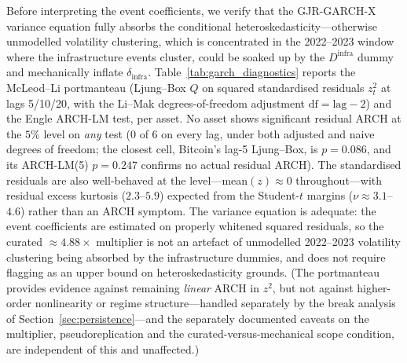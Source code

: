 \documentclass[pdflatex,sn-mathphys-num]{sn-jnl}
\theoremstyle{thmstyleone}
\theoremstyle{thmstyletwo}
\theoremstyle{thmstylethree}
\begin{document}
Before interpreting the event coefficients, we verify that the GJR-GARCH-X variance equation fully absorbs the conditional heteroskedasticity---otherwise unmodelled volatility clustering, which is concentrated in the 2022--2023 window where the infrastructure events cluster, could be soaked up by the $D^{\text{infra}}$ dummy and mechanically inflate $\delta_{\text{infra}}$. Table~\ref{tab:garch_diagnostics} reports the McLeod--Li portmanteau (Ljung--Box $Q$ on squared standardised residuals $z_t^2$ at lags 5/10/20, with the Li--Mak \citep{LiMak1994} degrees-of-freedom adjustment $\text{df}=\text{lag}-2$) and the Engle ARCH-LM test, per asset. No asset shows significant residual ARCH at the $5\%$ level on \emph{any} test (0 of 6 on every lag, under both adjusted and naive degrees of freedom; the closest cell, Bitcoin's lag-5 Ljung--Box, is $p=0.086$, and its ARCH-LM(5) $p=0.247$ confirms no actual residual ARCH). The standardised residuals are also well-behaved at the level---mean$(z)\approx 0$ throughout---with residual excess kurtosis ($2.3$--$5.9$) expected from the Student-$t$ margins ($\nu\approx 3.1$--$4.6$) rather than an ARCH symptom. The variance equation is adequate: the event coefficients are estimated on properly whitened squared residuals, so the curated $\approx 4.88\times$ multiplier is not an artefact of unmodelled 2022--2023 volatility clustering being absorbed by the infrastructure dummies, and does not require flagging as an upper bound on heteroskedasticity grounds. (The portmanteau provides evidence against remaining \emph{linear} ARCH in $z^2$, but not against higher-order nonlinearity or regime structure---handled separately by the break analysis of Section~\ref{sec:persistence}---and the separately documented caveats on the multiplier, pseudoreplication and the curated-versus-mechanical scope condition, are independent of this and unaffected.)
\end{document}
